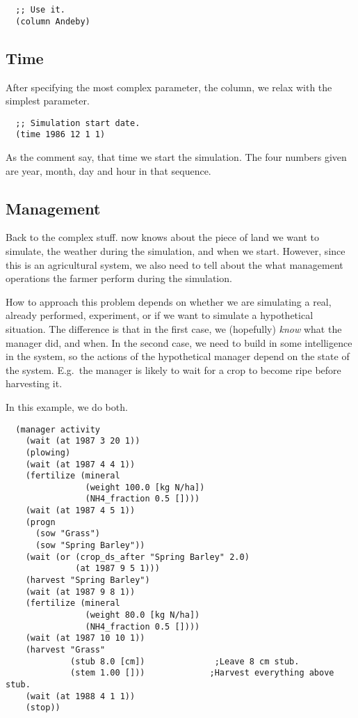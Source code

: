 \documentclass[a4paper,11pt]{article}
\begin{document}
\begin{verbatim}
  ;; Use it.
  (column Andeby)
\end{verbatim}

\subsection{Time}

After specifying the most complex \daisy{} parameter, the column, we
relax with the simplest parameter.

\begin{verbatim}
  ;; Simulation start date.
  (time 1986 12 1 1)
\end{verbatim}

As the comment say, that time we start the simulation.  The four
numbers given are year, month, day and hour in that sequence.

\subsection{Management}
\label{sec:ex-man}

Back to the complex stuff.  \Daisy{} now knows about the piece of land
we want to simulate, the weather during the simulation, and when we
start.  However, since this is an agricultural system, we also need to
tell \daisy{} about the what management operations the farmer perform
during the simulation.

How to approach this problem depends on whether we are simulating a
real, already performed, experiment, or if we want to simulate a
hypothetical situation.  The difference is that in the first case, we
(hopefully) \emph{know} what the manager did, and when.  In the second
case, we need to build in some intelligence in the system, so the
actions of the hypothetical manager depend on the state of the system.
E.g.\ the manager is likely to wait for a crop to become ripe before
harvesting it.

In this example, we do both.

\begin{verbatim}
  (manager activity
    (wait (at 1987 3 20 1))
    (plowing)
    (wait (at 1987 4 4 1))
    (fertilize (mineral
                (weight 100.0 [kg N/ha])
                (NH4_fraction 0.5 [])))
    (wait (at 1987 4 5 1))
    (progn
      (sow "Grass")
      (sow "Spring Barley"))
    (wait (or (crop_ds_after "Spring Barley" 2.0)
              (at 1987 9 5 1)))
    (harvest "Spring Barley")
    (wait (at 1987 9 8 1))
    (fertilize (mineral
                (weight 80.0 [kg N/ha])
                (NH4_fraction 0.5 [])))
    (wait (at 1987 10 10 1))
    (harvest "Grass"
             (stub 8.0 [cm])              ;Leave 8 cm stub.
             (stem 1.00 []))             ;Harvest everything above stub.
    (wait (at 1988 4 1 1))
    (stop))
\end{verbatim}
\end{document}
